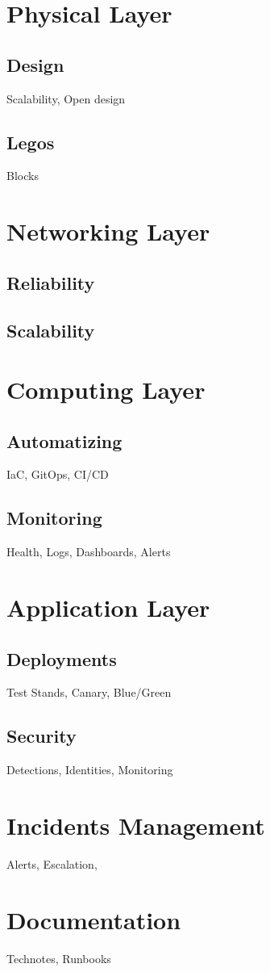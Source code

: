 \section{Physical Layer} \label{sec:physical}

\subsection{Design}
Scalability, Open design

\subsection{Legos}
Blocks

\section{Networking Layer} \label{sec:networking}

\subsection{Reliability}

\subsection{Scalability}

\section{Computing Layer} \label{sec:computing}

\subsection{Automatizing}
IaC, GitOps, CI/CD

\subsection{Monitoring}
Health, Logs, Dashboards, Alerts

\section{Application Layer} \label{sec:application}

\subsection{Deployments}
Test Stands, Canary, Blue/Green

\subsection{Security}
Detections, Identities, Monitoring

\section{Incidents Management}
Alerts, Escalation,

\section{Documentation}
Technotes, Runbooks

